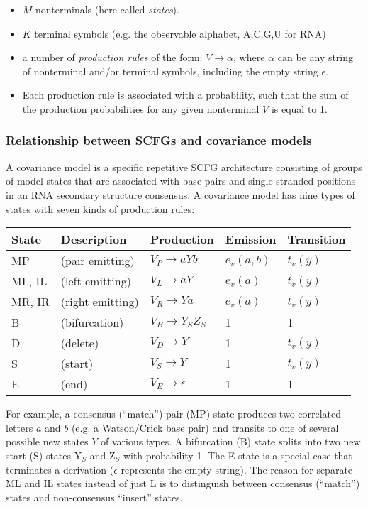 \documentclass[11pt]{article}
\begin{document}
\begin{itemize}
\item $M$ nonterminals (here called \emph{states}).
\item $K$ terminal symbols (e.g. the observable alphabet, {A,C,G,U} for RNA)
\item a number of \emph{production rules} of the form:
      $V \rightarrow \alpha$,
      where $\alpha$ can be any string of nonterminal and/or terminal
      symbols, including the empty string
      $\epsilon$.
\item Each production rule is associated with a probability, such that
      the sum of the production probabilities for any given
      nonterminal $V$ is equal to 1.
\end{itemize} 

\subsubsection{Relationship between SCFGs and covariance models}

A covariance model is a specific repetitive SCFG architecture
consisting of groups of model states that are associated with base
pairs and single-stranded positions in an RNA secondary structure
consensus. A covariance model has nine types of states with seven
kinds of production rules:

\begin{tabular}{lllll}
State  & Description             &  Production             & Emission & Transition\\ \hline
MP  & (pair emitting)           & $V_P \rightarrow a Y b$ & $e_v(a,b)$ & $t_v(y)$  \\
ML, IL & (left emitting)       & $V_L \rightarrow a Y$   & $e_v(a)$   & $t_v(y)$  \\
MR, IR & (right emitting)      & $V_R \rightarrow Y a$   & $e_v(a)$   & $t_v(y)$  \\
B &  (bifurcation)    & $V_B \rightarrow Y_S Z_S$  & 1     &     1     \\
D & (delete)         & $V_D \rightarrow Y$     &    1     &   $t_v(y)$  \\
S & (start)          & $V_S \rightarrow Y$     &    1     &   $t_v(y)$  \\
E & (end)            & $V_E \rightarrow \epsilon$ & 1     &     1     \\
\end{tabular}

For example, a consensus (``match'') pair (MP) state produces two
correlated letters $a$ and $b$ (e.g. a Watson/Crick base pair) and
transits to one of several possible new states $Y$ of various types.
A bifurcation (B) state splits into two new start (S) states Y$_{S}$
and Z$_{S}$ with probability 1.  The E state is a special case that
terminates a derivation ($\epsilon$ represents the empty string). The
reason for separate ML and IL states instead of just L is to
distinguish between consensus (``match'') states and non-consensus
``insert'' states.
\end{document}
